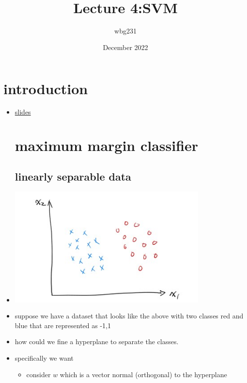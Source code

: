 \documentclass{article}
\title{Lecture 4:SVM}
\author{wbg231 }
\date{December 2022}
\begin{document}
\maketitle

\section*{introduction}
\begin{itemize}
\item \href{https://nyu-ds1003.github.io/mlcourse/2023/lectures/lec04/04.pdf}{slides}
\section{maximum margin classifier}
\subsection{linearly separable data }
\item \includegraphics[width=10cm]{lecture_notes/lecture_4/immmages/l4_1.jpg}
\item suppose we have a dataset that looks like the above with two classes red and blue that are represented as -1,1
\item how could we fine a hyperplane to separate the classes.
\item specifically we want 
\begin{itemize}
    \item consider $w$ which is a vector normal (orthogonal) to the hyperplane 


\end{itemize}
\end{itemize}
\end{document}
